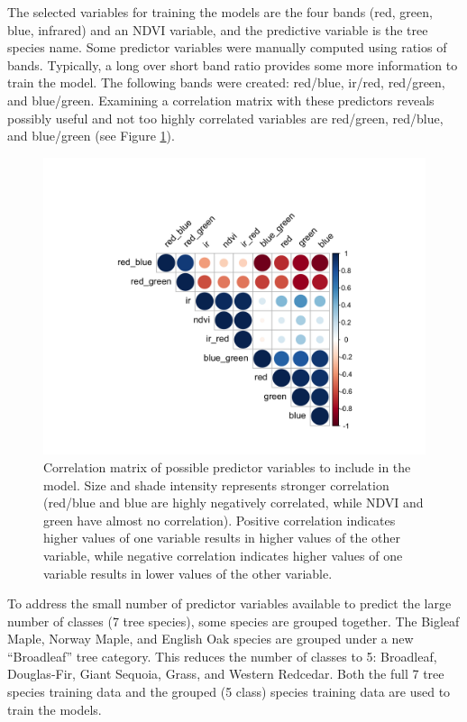 \documentclass[12pt,twoside]{reedthesis}
\begin{document}
The selected variables for training the models are the four bands (red, green, blue, infrared) and an NDVI variable, and the predictive variable is the tree species name. Some predictor variables were manually computed using ratios of bands. Typically, a long over short band ratio provides some more information to train the model. The following bands were created: red/blue, ir/red, red/green, and blue/green. Examining a correlation matrix with these predictors reveals possibly useful and not too highly correlated variables are red/green, red/blue, and blue/green (see Figure \ref{fig:corrmatrix}).
\begin{figure}

{\centering \includegraphics[width=0.7\linewidth]{figure/corrmatrix} 

}

\caption{Correlation matrix of possible predictor variables to include in the model. Size and shade intensity represents stronger correlation (red/blue and blue are highly negatively correlated, while NDVI and green have almost no correlation). Positive correlation indicates higher values of one variable results in higher values of the other variable, while negative correlation indicates higher values of one variable results in lower values of the other variable.}\label{fig:corrmatrix}
\end{figure}
To address the small number of predictor variables available to predict the large number of classes (7 tree species), some species are grouped together. The Bigleaf Maple, Norway Maple, and English Oak species are grouped under a new ``Broadleaf'' tree category. This reduces the number of classes to 5: Broadleaf, Douglas-Fir, Giant Sequoia, Grass, and Western Redcedar. Both the full 7 tree species training data and the grouped (5 class) species training data are used to train the models.
\end{document}

